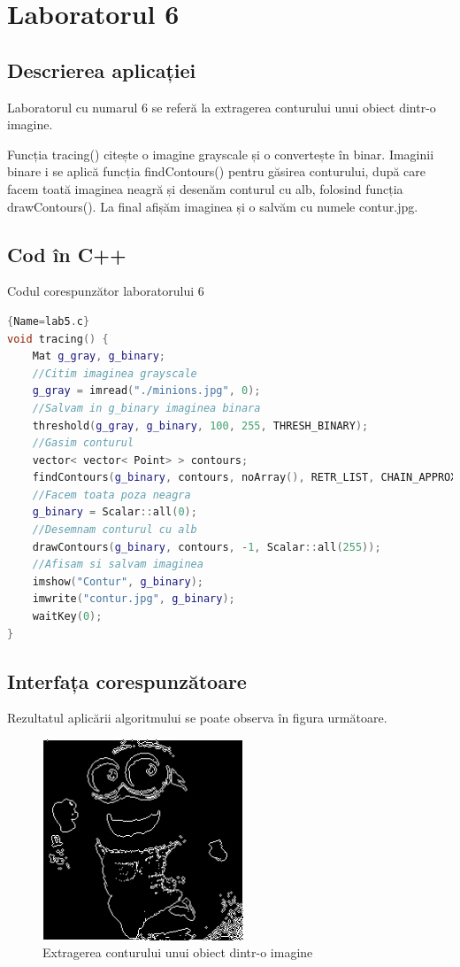 \documentclass{amsart}
\begin{document}
\newpage

\section{Laboratorul 6}

\subsection{Descrierea aplicației}
\par
Laboratorul cu numarul 6 se referă la extragerea conturului unui obiect dintr-o imagine.
\\ \par
Funcția tracing() citește o imagine grayscale și o convertește în binar. Imaginii binare i se aplică funcția findContours() pentru găsirea conturului, după care facem toată imaginea neagră și desenăm conturul cu alb, folosind funcția drawContours(). La final afișăm imaginea și o salvăm cu numele contur.jpg.

\subsection{Cod \^{i}n C++}

Codul corespunzător laboratorului 6

\begin{lstlisting}[language=C++]{Name=lab5.c}
void tracing() {
	Mat g_gray, g_binary;
	//Citim imaginea grayscale
	g_gray = imread("./minions.jpg", 0);
	//Salvam in g_binary imaginea binara
	threshold(g_gray, g_binary, 100, 255, THRESH_BINARY);
	//Gasim conturul
	vector< vector< Point> > contours;
	findContours(g_binary, contours, noArray(), RETR_LIST, CHAIN_APPROX_SIMPLE);
	//Facem toata poza neagra
	g_binary = Scalar::all(0);
	//Desemnam conturul cu alb
	drawContours(g_binary, contours, -1, Scalar::all(255));
	//Afisam si salvam imaginea
	imshow("Contur", g_binary);
	imwrite("contur.jpg", g_binary);
	waitKey(0);
}
 \end{lstlisting}

\subsection{Interfața corespunzătoare}

Rezultatul aplic\u{a}rii algoritmului se poate observa \^{i}n figura următoare. 
\begin{figure}[ht]
\includegraphics[width=6cm]{contur.jpg}
\caption{Extragerea conturului unui obiect dintr-o imagine}
\end{figure}
\end{document}
